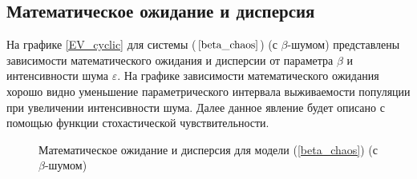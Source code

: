 \subsection{Математическое ожидание и дисперсия}

    На графике \ref{EV_cyclic} для системы (\(\ref{beta_chaos}\)) (с \(\beta\)-шумом) представлены зависимости математического ожидания и дисперсии от параметра \(\beta\) и интенсивности шума \(\varepsilon\). На графике зависимости математического ожидания хорошо видно уменьшение параметрического интервала выживаемости популяции при увеличении интенсивности шума. Далее данное явление будет описано с помощью функции стохастической чувствительности.

    \begin{figure}
        \centering
        
        \captionsetup{justification=centering}
        \caption{Математическое ожидание и дисперсия для модели (\ref{beta_chaos}) (с \(\beta\)-шумом)}
    \end{figure}
        
        

